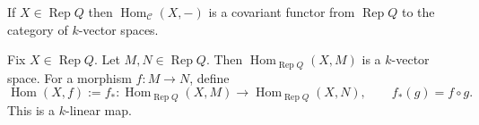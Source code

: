 \documentclass[11pt, a4paper]{report}
\begin{document}
If $ X \in \operatorname{Rep}Q $ then $ \operatorname{Hom}_{\mathcal{C}}(X,-) $ is a covariant functor from $ \operatorname{Rep}Q $ to the category of $ k $-vector spaces.

\begin{example} 
Fix $ X \in \operatorname{Rep}Q $. Let $ M, N \in \operatorname{Rep}Q $. Then $ \operatorname{Hom}_{\operatorname{Rep}Q}(X,M) $ is a $ k $-vector space. For a morphism $ f:M\to N $, define
\[
\operatorname{Hom}(X,f):=f_*:\operatorname{Hom}_{\operatorname{Rep}Q}(X,M)\to \operatorname{Hom}_{\operatorname{Rep}Q}(X,N),
\qquad
f_*(g)=f\circ g.
\]
This is a $ k $-linear map.
\end{example}
\end{document}
